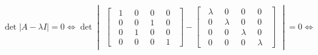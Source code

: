 \documentclass[12pt]{article}
\begin{document}
$$ \det |A-\lambda I| = 0 \Leftrightarrow \det \begin{vmatrix}\begin{bmatrix} \;\;1 &\;\; 0 &\;\; 0&\;\; 0\;\; \\
    \;\;0 &\;\; 0 &\;\; 1&\;\; 0\;\;\\
    \;\;0 &\;\; 1 &\;\; 0&\;\; 0\;\;\\
    \;\;0 &\;\; 0 &\;\; 0&\;\; 1\;\;      \end{bmatrix} -\begin{bmatrix} \;\;\lambda &\;\; 0 &\;\; 0&\;\; 0\;\; \\
        \;\;0 &\;\; \lambda &\;\; 0&\;\; 0\;\;\\
        \;\;0 &\;\; 0&\;\; \lambda&\;\; 0\;\;\\
        \;\;0 &\;\; 0 &\;\; 0&\;\; \lambda\;\;      \end{bmatrix} \end{vmatrix}  =0 \Leftrightarrow$$
\end{document}
